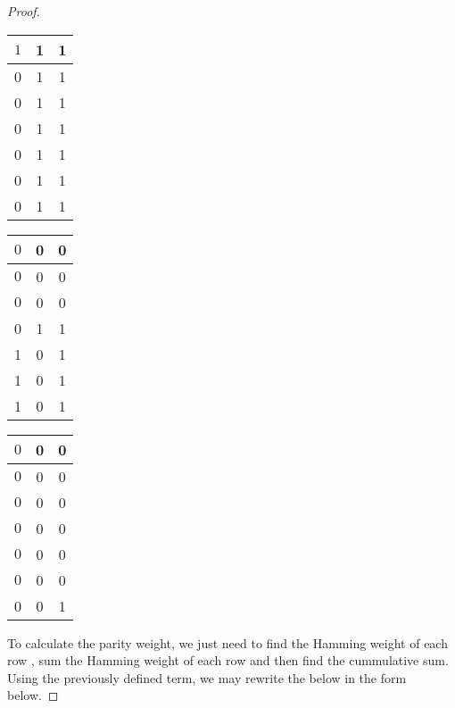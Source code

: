 \documentclass[fontsize=12pt]{article}
\theoremstyle{definition}
\begin{document}
\begin{proof}
\begin{center}
\begin{tabular}{| c | c | c |}
\hline
$1$ & 1 &1 \\
\hline
0 &1 &1 \\
\hline
 0 &1 &1 \\
\hline
 0 &1 &1 \\
\hline
 0 &1 &1 \\
\hline
 0 &1 &1 \\
\hline
0 &1 &1 \\
\hline
\end{tabular}
\quad
\begin{tabular}{| c | c | c |}
\hline
$0$ & 0 &0 \\
\hline
$0$ & 0 &0 \\
\hline
 $0$ & 0 &0 \\
\hline
 0 &1 &1 \\
\hline
 1 &0 &1 \\
\hline
 1 &0 &1 \\
\hline
1 &0 &1 \\
\hline
\end{tabular}
\quad
\begin{tabular}{| c | c | c |}
\hline
$0$ & 0 &0 \\
\hline
$0$ & 0 &0 \\
\hline
 $0$ & 0 &0 \\
\hline
 $0$ & 0 &0 \\
\hline
  $0$ & 0 &0 \\
\hline
 $0$ & 0 &0 \\
\hline
0 &0 &1 \\
\hline
\end{tabular}
\end{center}

To calculate the parity weight, we just need to find the Hamming weight of each row , sum the Hamming weight of each row and then find the cummulative sum. Using the previously defined term, we may rewrite the below in the form below.


\end{proof}
\end{document}
